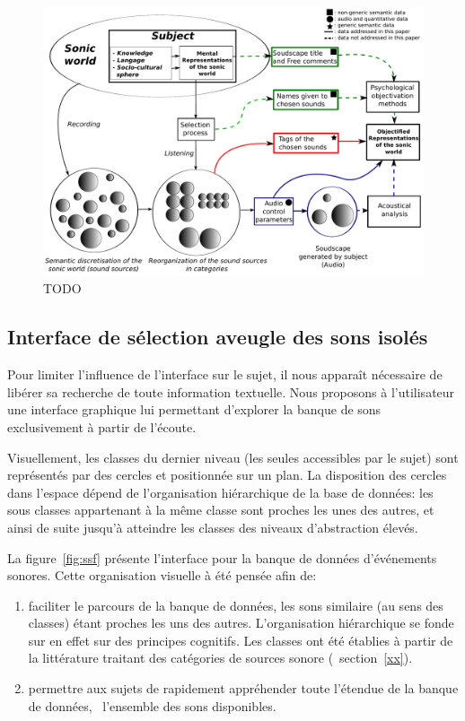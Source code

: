 \begin{figure}[bth]
        \myfloatalign
        \includegraphics[width=.8\linewidth]{gfx/2}
       \caption{TODO}\label{fig:paradigmeSimu2}
\end{figure}

\subsection{Interface de sélection aveugle des sons isolés}
\label{sec:ch4_ssf}

Pour limiter l’influence de l’interface sur le sujet, il nous apparaît nécessaire de libérer sa recherche de toute information textuelle. Nous proposons à l'utilisateur une interface graphique lui permettant d’explorer la banque de sons exclusivement à partir de l’écoute.

Visuellement, les classes du dernier niveau (les seules accessibles par le sujet) sont représentés par des cercles et positionnée sur un plan. La disposition des cercles dans l'espace dépend de l’organisation hiérarchique de la base de données: les sous classes appartenant à la même classe sont proches les unes des autres, et ainsi de suite jusqu'à atteindre les classes des niveaux d'abstraction élevés.

La figure~\ref{fig:ssf} présente l'interface pour la banque de données d'événements sonores. Cette organisation visuelle à été pensée afin de:

\begin{enumerate}
\item faciliter le parcours de la banque de données, les sons similaire (au sens des classes) étant proches les uns des autres. L'organisation hiérarchique se fonde sur en effet sur des principes cognitifs. Les classes ont été établies à partir de la littérature traitant des catégories de sources sonore (\cf~section~\ref{xx}).
\item permettre aux sujets de rapidement appréhender toute l'étendue de la banque de données, \ie~l'ensemble des sons disponibles.
\end{enumerate}

